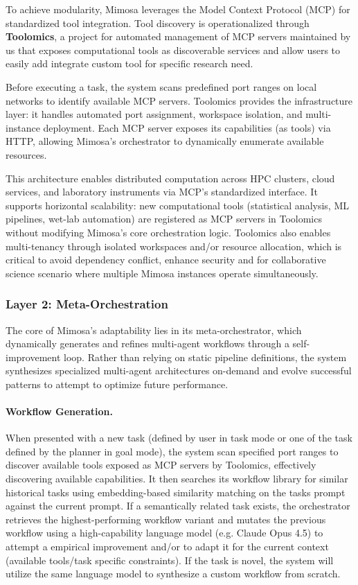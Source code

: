 \documentclass{article}
\begin{document}
To achieve modularity, Mimosa leverages the Model Context Protocol (MCP) for standardized tool integration. Tool discovery is operationalized through \textbf{Toolomics}, a project for automated management of MCP servers maintained by us that exposes computational tools as discoverable services and allow users to easily add integrate custom tool for specific research need.

Before executing a task, the system scans predefined port ranges on local networks to identify available MCP servers. Toolomics provides the infrastructure layer: it handles automated port assignment, workspace isolation, and multi-instance deployment. Each MCP server exposes its capabilities (as tools) via HTTP, allowing Mimosa's orchestrator to dynamically enumerate available resources.

This architecture enables distributed computation across HPC clusters, cloud services, and laboratory instruments via MCP's standardized interface. It supports horizontal scalability: new computational tools (statistical analysis, ML pipelines, wet-lab automation) are registered as MCP servers in Toolomics without modifying Mimosa's core orchestration logic. Toolomics also enables multi-tenancy through isolated workspaces and/or resource allocation, which is critical to avoid dependency conflict, enhance security and for collaborative science scenario where multiple Mimosa instances operate simultaneously.

\subsubsection{\textbf{Layer 2: Meta-Orchestration}}

The core of Mimosa's adaptability lies in its meta-orchestrator, which dynamically generates and refines multi-agent workflows through a self-improvement loop. Rather than relying on static pipeline definitions, the system synthesizes specialized multi-agent architectures on-demand and evolve successful patterns to attempt to optimize future performance.

\paragraph{Workflow Generation.}

When presented with a new task (defined by user in task mode or one of the task defined by the planner in goal mode), the system scan specified port ranges to discover available tools exposed as MCP servers by Toolomics, effectively discovering available capabilities. It then searches its workflow library for similar historical tasks using embedding-based similarity matching on the tasks prompt against the current prompt. If a semantically related task exists, the orchestrator retrieves the highest-performing workflow variant and mutates the previous workflow using a high-capability language model (e.g. Claude Opus 4.5) to attempt a empirical improvement and/or to adapt it for the current context (available tools/task specific constraints). If the task is novel, the system will utilize the same language model to synthesize a custom workflow from scratch.
\end{document}
